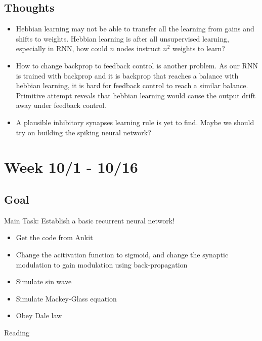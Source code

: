 \documentclass[12pt, a4paper]{article}
\begin{document}
\subsection*{Thoughts}

\begin{itemize}
    \item Hebbian learning may not be able to transfer all the learning from gains and shifts to weights. Hebbian learning is after all unsupervised learning, especially in RNN, how could $n$ nodes instruct $n^2$ weights to learn?
    \item How to change backprop to feedback control is another problem. As our RNN is trained with backprop and it is backprop that reaches a balance with hebbian learning, it is hard for feedback control to reach a similar balance. Primitive attempt reveals that hebbian learning would cause the output drift away under feedback control.
    \item A plausible inhibitory synapses learning rule is yet to find. Maybe we should try on building the spiking neural network?
\end{itemize}

\newpage


\section*{Week 10/1 - 10/16}

\subsection*{Goal}

\noindent
Main Task: Establish a basic recurrent neural network!

\begin{itemize}
    \item Get the code from Ankit
    \item Change the acitivation function to sigmoid, and change the synaptic modulation to gain modulation using back-propagation
    \item Simulate sin wave
    \item Simulate Mackey-Glass equation
    \item Obey Dale law
\end{itemize}

\noindent
Reading
\end{document}
